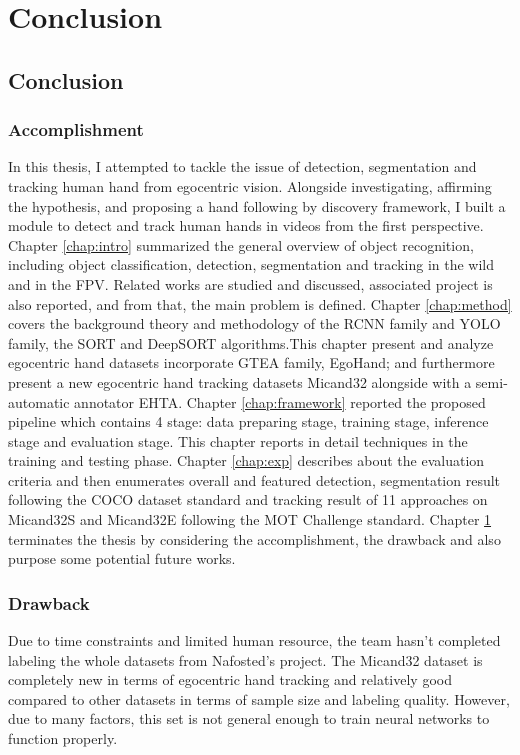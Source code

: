 \chapter{Conclusion}\label{chap:conclusion}
\section{Conclusion}
\subsection{Accomplishment}
In this thesis, I attempted to tackle the issue of detection, segmentation and tracking human hand from egocentric vision. Alongside investigating, affirming the hypothesis, and proposing a hand following by discovery framework, I built a module to detect and track human hands in videos from the first perspective. Chapter \ref{chap:intro} summarized the general overview of object recognition, including object classification, detection, segmentation and tracking in the wild and in the FPV. Related works are studied and discussed, associated project is also reported, and from that, the main problem is defined. Chapter \ref{chap:method} covers the background theory and methodology of the RCNN family and YOLO family, the SORT and DeepSORT algorithms.This chapter present and analyze egocentric hand datasets incorporate GTEA family, EgoHand; and furthermore present a new egocentric hand tracking datasets Micand32 alongside with a semi-automatic annotator EHTA. Chapter \ref{chap:framework} reported the proposed pipeline which contains 4 stage: data preparing stage, training stage, inference stage and evaluation stage. This chapter reports in detail techniques in the training and testing phase. Chapter \ref{chap:exp} describes about the evaluation criteria and then enumerates overall and featured detection, segmentation result following the COCO dataset standard and tracking result of 11 approaches on Micand32S and Micand32E following the MOT Challenge standard. Chapter \ref{chap:conclusion} terminates the thesis by considering the accomplishment, the drawback and also purpose some potential future works.
\subsection{Drawback}
Due to time constraints and limited human resource, the team hasn't completed labeling the whole datasets from Nafosted's project. The Micand32 dataset is completely new in terms of egocentric hand tracking and relatively good compared to other datasets in terms of sample size and labeling quality. However, due to many factors, this set is not general enough to train neural networks to function properly.

